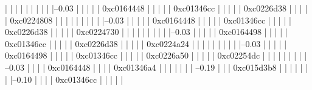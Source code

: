             |          |          |          |          |          
            |          |          |          |          |--0.03%
            |          |          |          |          |          0xc0164448
            |          |          |          |          |          0xc01346cc
            |          |          |          |          |          0xc0226d38
            |          |          |          |          |          0xc0224808
            |          |          |          |          |          
            |          |          |          |          |--0.03%
            |          |          |          |          |          0xc0164448
            |          |          |          |          |          0xc01346cc
            |          |          |          |          |          0xc0226d38
            |          |          |          |          |          0xc0224730
            |          |          |          |          |          
            |          |          |          |          |--0.03%
            |          |          |          |          |          0xc0164498
            |          |          |          |          |          0xc01346cc
            |          |          |          |          |          0xc0226d38
            |          |          |          |          |          0xc0224a24
            |          |          |          |          |          
            |          |          |          |          |--0.03%
            |          |          |          |          |          0xc0164498
            |          |          |          |          |          0xc01346cc
            |          |          |          |          |          0xc0226a50
            |          |          |          |          |          0xc02254dc
            |          |          |          |          |          
            |          |          |          |           --0.03%
            |          |          |          |                     0xc0164448
            |          |          |          |                     0xc01346a4
            |          |          |          |          
            |          |          |           --0.19%
            |          |          |                     0xc015d3b8
            |          |          |                     |          
            |          |          |                     |--0.10%
            |          |          |                     |          0xc01346cc
            |          |          |                     |          |          
